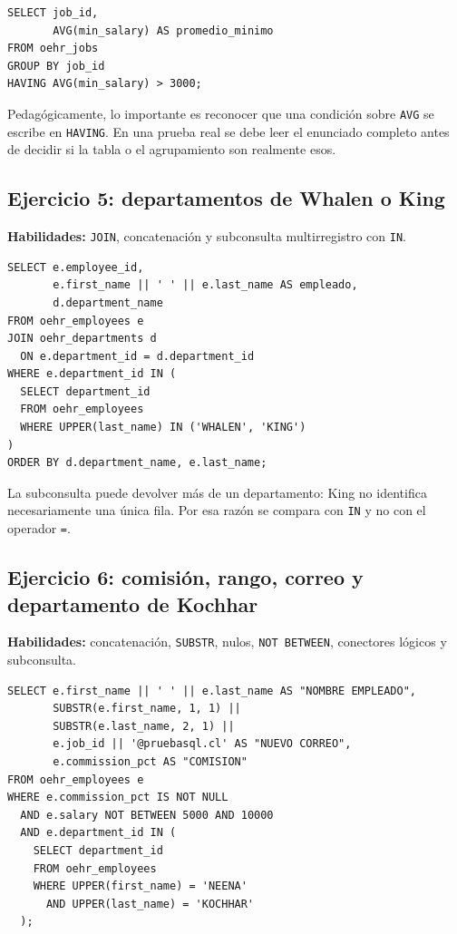 \documentclass[11pt,a4paper]{article}
\newcommand{\campo}[1]{\texttt{#1}}
\begin{document}
\begin{lstlisting}
SELECT job_id,
       AVG(min_salary) AS promedio_minimo
FROM oehr_jobs
GROUP BY job_id
HAVING AVG(min_salary) > 3000;
\end{lstlisting}

Pedagógicamente, lo importante es reconocer que una condición sobre \campo{AVG} se escribe en
\campo{HAVING}. En una prueba real se debe leer el enunciado completo antes de decidir si la tabla o
el agrupamiento son realmente esos.

\subsection{Ejercicio 5: departamentos de Whalen o King}

\textbf{Habilidades:} \campo{JOIN}, concatenación y subconsulta multirregistro con \campo{IN}.

\begin{lstlisting}
SELECT e.employee_id,
       e.first_name || ' ' || e.last_name AS empleado,
       d.department_name
FROM oehr_employees e
JOIN oehr_departments d
  ON e.department_id = d.department_id
WHERE e.department_id IN (
  SELECT department_id
  FROM oehr_employees
  WHERE UPPER(last_name) IN ('WHALEN', 'KING')
)
ORDER BY d.department_name, e.last_name;
\end{lstlisting}

La subconsulta puede devolver más de un departamento: King no identifica necesariamente una única
fila. Por esa razón se compara con \campo{IN} y no con el operador \campo{=}.

\subsection{Ejercicio 6: comisión, rango, correo y departamento de Kochhar}

\textbf{Habilidades:} concatenación, \campo{SUBSTR}, nulos, \campo{NOT BETWEEN}, conectores lógicos
y subconsulta.

\begin{lstlisting}
SELECT e.first_name || ' ' || e.last_name AS "NOMBRE EMPLEADO",
       SUBSTR(e.first_name, 1, 1) ||
       SUBSTR(e.last_name, 2, 1) ||
       e.job_id || '@pruebasql.cl' AS "NUEVO CORREO",
       e.commission_pct AS "COMISION"
FROM oehr_employees e
WHERE e.commission_pct IS NOT NULL
  AND e.salary NOT BETWEEN 5000 AND 10000
  AND e.department_id IN (
    SELECT department_id
    FROM oehr_employees
    WHERE UPPER(first_name) = 'NEENA'
      AND UPPER(last_name) = 'KOCHHAR'
  );
\end{lstlisting}
\end{document}
